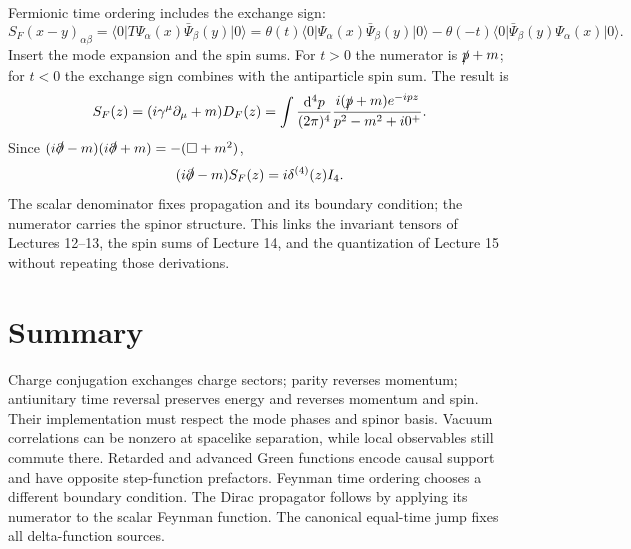 \documentclass[11pt]{article}
\newcommand{\dd}{\mathrm{d}}
\newcommand{\vac}{\lvert0\rangle}
\newcommand{\vbra}{\langle0\rvert}
\begin{document}
Fermionic time ordering includes the exchange sign:
\begin{equation}
 S_F(x-y)_{\alpha\beta}=\vbra T\Psi_\alpha(x)\bar\Psi_\beta(y)\vac
 =\theta(t)\vbra\Psi_\alpha(x)\bar\Psi_\beta(y)\vac
 -\theta(-t)\vbra\bar\Psi_\beta(y)\Psi_\alpha(x)\vac.
 \label{k-eq:SFtime}
\end{equation}
Insert the mode expansion and the spin sums. For \(t>0\) the numerator is
\(\slashed p+m\); for \(t<0\) the exchange sign combines with the
antiparticle spin sum. The result is
\begin{equation}
 S_F(z)=(i\gamma^\mu\partial_\mu+m)D_F(z)
 =\int\frac{\dd^4p}{(2\pi)^4}
       \frac{i(\slashed p+m)e^{-ipz}}{p^2-m^2+i0^+}.
 \label{k-eq:SF}
\end{equation}
Since
\((i\slashed\partial-m)(i\slashed\partial+m)=-(\Box+m^2)\),
\begin{equation}
 (i\slashed\partial-m)S_F(z)=i\delta^{(4)}(z)I_4.
 \label{k-eq:SFsource}
\end{equation}
The scalar denominator fixes propagation and its boundary condition;
the numerator carries the spinor structure. This links the invariant
tensors of Lectures 12--13, the spin sums of Lecture 14, and the
quantization of Lecture 15 without repeating those derivations.

\section*{Summary}
Charge conjugation exchanges charge sectors; parity reverses momentum;
antiunitary time reversal preserves energy and reverses momentum and spin.
Their implementation must respect the mode phases and spinor basis.
Vacuum correlations can be nonzero at spacelike separation, while local
observables still commute there. Retarded and advanced Green functions
encode causal support and have opposite step-function prefactors.
Feynman time ordering chooses a different boundary condition. The Dirac
propagator follows by applying its numerator to the scalar Feynman function.
The canonical equal-time jump fixes all delta-function sources.

\newpage
\end{document}
